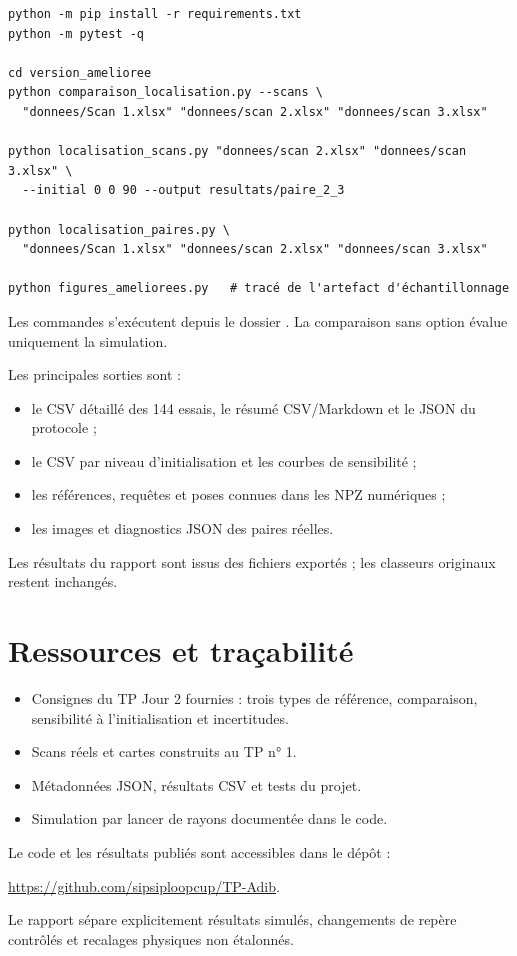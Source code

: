 \documentclass[11pt,a4paper]{article}
\newcommand{\code}[1]{\texttt{\detokenize{#1}}}
\begin{document}
\begin{lstlisting}
python -m pip install -r requirements.txt
python -m pytest -q

cd version_amelioree
python comparaison_localisation.py --scans \
  "donnees/Scan 1.xlsx" "donnees/scan 2.xlsx" "donnees/scan 3.xlsx"

python localisation_scans.py "donnees/scan 2.xlsx" "donnees/scan 3.xlsx" \
  --initial 0 0 90 --output resultats/paire_2_3

python localisation_paires.py \
  "donnees/Scan 1.xlsx" "donnees/scan 2.xlsx" "donnees/scan 3.xlsx"

python figures_ameliorees.py   # tracé de l'artefact d'échantillonnage
\end{lstlisting}
Les commandes s'exécutent depuis le dossier \code{version_amelioree}.
La comparaison sans option \code{--scans} évalue uniquement la simulation.

Les principales sorties sont :
\begin{itemize}
\item le CSV détaillé des 144 essais, le résumé CSV/Markdown et le JSON
du protocole ;
\item le CSV par niveau d'initialisation et les courbes de sensibilité ;
\item les références, requêtes et poses connues dans les NPZ numériques ;
\item les images et diagnostics JSON des paires réelles.
\end{itemize}
Les résultats du rapport sont issus des fichiers exportés ; les classeurs
originaux restent inchangés.

\section{Ressources et traçabilité}
\begin{itemize}
\item Consignes du TP Jour 2 fournies : trois types de référence,
comparaison, sensibilité à l'initialisation et incertitudes.
\item Scans réels et cartes construits au TP n° 1.
\item Métadonnées JSON, résultats CSV et tests du projet.
\item Simulation par lancer de rayons documentée dans le code.
\end{itemize}
Le code et les résultats publiés sont accessibles dans le dépôt :

\url{https://github.com/sipsiploopcup/TP-Adib}.

Le rapport sépare explicitement résultats simulés, changements de repère
contrôlés et recalages physiques non étalonnés.
\end{document}
